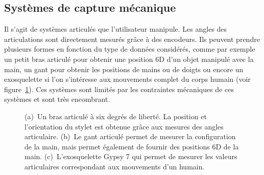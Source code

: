 \subsection{Systèmes de capture mécanique}
Il s'agit de systèmes articulés que l'utilisateur manipule. Les angles des articulations sont
directement mesurés gr\^ace à des encodeurs. Ils peuvent prendre plusieurs formes en fonction
du type de données considérés, comme par exemple un petit bras articulé pour obtenir
une position 6D d'un objet manipulé avec la main, un gant pour obtenir
les positions de mains ou de doigts ou encore
un exosquelette si l'on s'intéresse aux mouvements complet du corps humain (voir figure~\ref{fig:mecaMocap}).
Ces systèmes sont limités par les contraintes mécaniques de ces systèmes et sont très encombrant.
\begin{figure}[p]
  \begin{center}
  \end{center}
  \caption[Systèmes de capture de mouvements mécaniques.]{(a)~Un bras articulé à six degrés de liberté. La position et l'orientation du stylet est obtenue
  gr\^ace aux mesures des angles articulaire. (b)~Le gant articulé permet de mesurer la configuration
  de la main, mais permet également de fournir des positions 6D de la main. (c)~L'exosquelette Gypsy 7
  qui permet de mesurer les valeurs articulaires correspondant aux mouvements d'un humain.}
  \label{fig:mecaMocap}
\end{figure}

